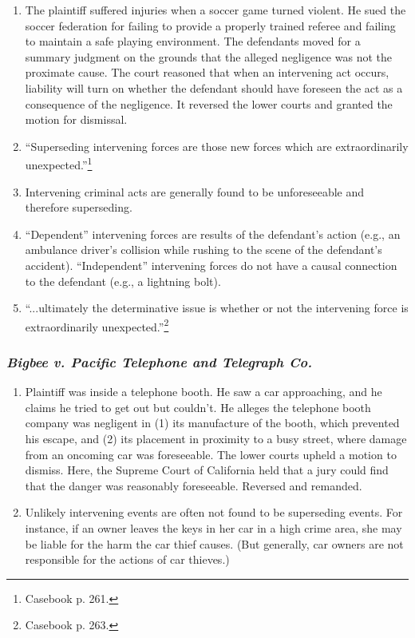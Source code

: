 \begin{enumerate}
    \item The plaintiff suffered injuries when a soccer game turned violent. 
    He sued the soccer federation for failing to provide a properly trained 
    referee and failing to maintain a safe playing environment. The defendants 
    moved for a summary judgment on the grounds that the alleged negligence 
    was not the proximate cause. The court reasoned that when an intervening 
    act occurs, liability will turn on whether the defendant should have 
    foreseen the act as a consequence of the negligence. It reversed the lower 
    courts and granted the motion for dismissal.
    \item ``Superseding intervening forces are those new forces which are 
    extraordinarily unexpected.''\footnote{Casebook p. 261.}
    \item Intervening criminal acts are generally found to be unforeseeable 
    and therefore superseding.
    \item ``Dependent'' intervening forces are results of the defendant's 
    action (e.g., an ambulance driver's collision while rushing to the scene 
    of the defendant's accident). ``Independent'' intervening forces do not 
    have a causal connection to the defendant (e.g., a lightning bolt).
    \item ``...ultimately the determinative issue is whether or not the 
    intervening force is extraordinarily unexpected.''\footnote{Casebook p. 
    263.}
\end{enumerate}

\subsubsection{\emph{Bigbee v. Pacific Telephone and Telegraph Co.}}

\begin{enumerate}
    \item Plaintiff was inside a telephone booth. He saw a car approaching, 
    and he claims he tried to get out but couldn't. He alleges the telephone 
    booth company was negligent in (1) its manufacture of the booth, which 
    prevented his escape, and (2) its placement in proximity to a busy street, 
    where damage from an oncoming car was foreseeable. The lower courts upheld 
    a motion to dismiss. Here, the Supreme Court of California held that a 
    jury could find that the danger was reasonably foreseeable. Reversed and 
    remanded.
    \item Unlikely intervening events are often not found to be superseding 
    events. For instance, if an owner leaves the keys in her car in a high 
    crime area, she may be liable for the harm the car thief causes. (But 
    generally, car owners are not responsible for the actions of car thieves.)
\end{enumerate}

